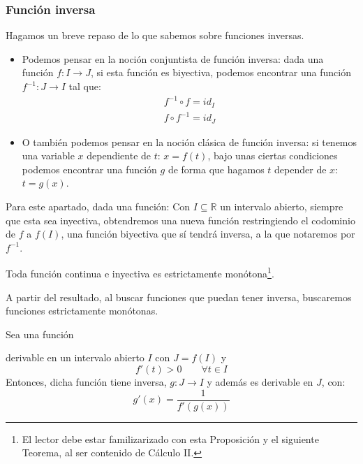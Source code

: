 \subsubsection{Función inversa}
Hagamos un breve repaso de lo que sabemos sobre funciones inversas. 
\begin{itemize}
    \item Podemos pensar en la noción conjuntista de función inversa: dada una función $f:I\rightarrow J$, si esta función es biyectiva, podemos encontrar una función ${f^{-1}:J\rightarrow I}$ tal que:
        \begin{gather*}
            f^{-1}\circ f = id_I \\
            f\circ f^{-1} = id_J
        \end{gather*}
    \item O también podemos pensar en la noción clásica de función inversa: si tenemos una variable $x$ dependiente de $t$: $x = f(t)$, bajo unas ciertas condiciones podemos encontrar una función $g$ de forma que hagamos $t$ depender de $x$: $t = g(x)$.
\end{itemize}

Para este apartado, dada una función:
Con $I\subseteq \mathbb{R}$ un intervalo abierto, siempre que esta sea inyectiva, obtendremos una nueva función restringiendo el codominio de $f$ a $f(I)$, una función biyectiva que sí tendrá inversa, a la que notaremos por $f^{-1}$.

\begin{prop}
    Toda función continua e inyectiva es estrictamente monótona\footnote{El lector debe estar familizarizado con esta Proposición y el siguiente Teorema, al ser contenido de Cálculo II.}.
\end{prop}
A partir del resultado, al buscar funciones que puedan tener inversa, buscaremos funciones estrictamente monótonas.

\begin{teo}\label{teo:funcion_inversa}
    Sea una función

    derivable en un intervalo abierto $I$ con $J=f(I)$ y
    \begin{equation*}
        f'(t) > 0 \qquad \forall t\in I
    \end{equation*}
    Entonces, dicha función tiene inversa, $g:J\rightarrow I$ y además es derivable en $J$, con:
    \begin{equation*}
        g'(x) = \dfrac{1}{f'(g(x))}
    \end{equation*}
\end{teo}

